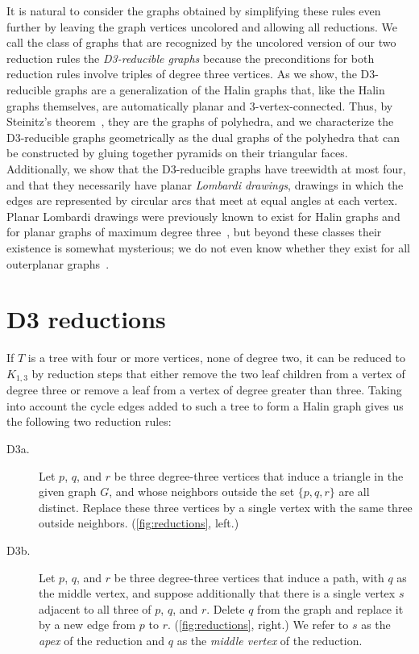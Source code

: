 \documentclass{article}
\begin{document}
It is natural to consider the graphs obtained by simplifying these rules even further by leaving the graph vertices uncolored and allowing all reductions. We call the class of graphs that are recognized by the uncolored version of our two reduction rules the \emph{D3-reducible graphs} because the preconditions for both reduction rules involve triples of degree three vertices. As we show, the D3-reducible graphs are a generalization of the Halin graphs that, like the Halin graphs themselves, are automatically planar and 3-vertex-connected. Thus, by Steinitz's theorem~\cite{Ste-EMW-22}, they are the graphs of polyhedra, and we characterize the D3-reducible graphs geometrically as the dual graphs of the polyhedra that can be constructed by gluing together pyramids on their triangular faces. Additionally, we show that the D3-reducible graphs have treewidth at most four, and that they necessarily have planar \emph{Lombardi drawings}, drawings in which the edges are represented by circular arcs that meet at equal angles at each vertex. Planar Lombardi drawings were previously known to exist for Halin graphs and for planar graphs of maximum degree three~\cite{DunEppGoo-JGAA-12,Epp-DCG-14}, but beyond these classes their existence is somewhat mysterious; we do not even know whether they exist for all outerplanar graphs~\cite{LofNol-GD-12}.

\section{D3 reductions}

If $T$ is a tree with four or more vertices, none of degree two, it can be reduced to $K_{1,3}$ by reduction steps that either remove the two leaf children from a vertex of degree three or remove a leaf from a vertex of degree greater than three. Taking into account the cycle edges added to such a tree to form a Halin graph gives us the following two reduction rules:

\begin{description}
\item[D3a.] Let $p$, $q$, and $r$ be three degree-three vertices that induce a triangle in the given graph $G$, and whose neighbors outside the set $\{p,q,r\}$ are all distinct. Replace these three vertices by a single vertex with the same three outside neighbors. (\autoref{fig:reductions}, left.)
\item[D3b.] Let $p$, $q$, and $r$ be three degree-three vertices that induce a path, with $q$ as the middle vertex, and suppose additionally that there is a single vertex $s$ adjacent to all three of $p$, $q$, and $r$.
Delete $q$ from the graph and replace it by a new edge from $p$ to $r$. (\autoref{fig:reductions}, right.) We refer to $s$ as the \emph{apex} of the reduction and $q$ as the \emph{middle vertex} of the reduction.
\end{description}
\end{document}

